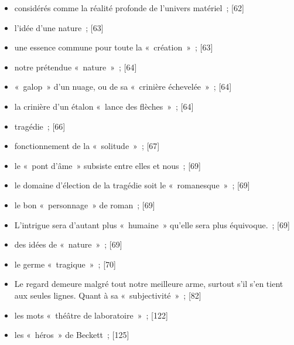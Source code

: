 \documentclass[12pt, a4paper]{article}
\begin{document}
\begin{itemize}
    \item considérés comme la réalité profonde de l’univers matériel{\color{gray}~; [62]}

    \item l’idée d’une nature{\color{gray}~; [63]}

    \item une essence commune pour toute la «~création~»{\color{gray}~; [63]}

    \item  notre prétendue «~nature~»{\color{gray}~; [64]}

    \item «~galop~» d’un nuage, ou de sa «~crinière échevelée~»{\color{gray}~; [64]}

    \item la crinière d’un étalon «~lance des flèches~»{\color{gray}~; [64]}

    \item tragédie{\color{gray}~; [66]}

    \item fonctionnement de la «~solitude~»{\color{gray}~; [67]}

    \item le «~pont d’âme~» subsiste entre elles et nous{\color{gray}~; [69]}

    \item le domaine d’élection de la tragédie soit le «~romanesque~»{\color{gray}~; [69]}

    \item le bon «~personnage~» de roman{\color{gray}~; [69]}

    \item L’intrigue sera d’autant plus «~humaine~» qu’elle sera plus équivoque.{\color{gray}~; [69]}

    \item des idées de «~nature~»{\color{gray}~; [69]}

    \item le germe «~tragique~»{\color{gray}~; [70]}

    \item Le regard demeure malgré tout notre meilleure arme, surtout s’il s’en tient aux seules
                  lignes. Quant à sa «~subjectivité~»{\color{gray}~; [82]}

    \item les mots «~théâtre de laboratoire~»{\color{gray}~; [122]}

    \item les «~héros~» de Beckett{\color{gray}~; [125]}


\end{itemize}
\end{document}
